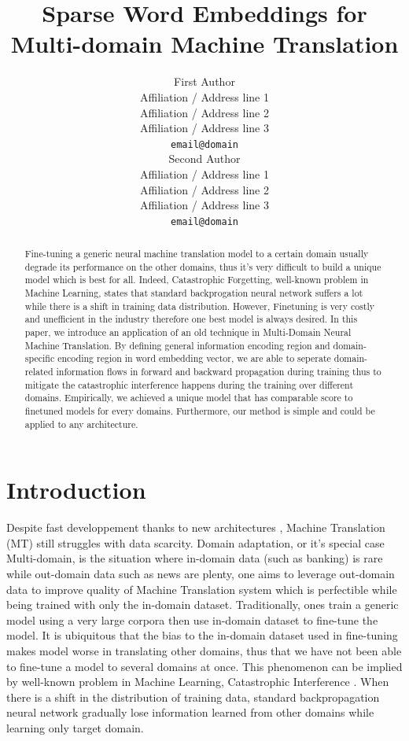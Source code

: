 \documentclass[11pt,a4paper]{article}
\title{Sparse Word Embeddings for Multi-domain Machine Translation}
\author{First Author \\%
  Affiliation / Address line 1 \\
  Affiliation / Address line 2 \\
  Affiliation / Address line 3 \\
  {\tt email@domain} \\\And
  Second Author \\
  Affiliation / Address line 1 \\
  Affiliation / Address line 2 \\
  Affiliation / Address line 3 \\
  {\tt email@domain} \\}
\date{}
\newcommand{\fyTodo}[1]{\Todo[FY:]{\textcolor{orange}{#1}}}
\newcommand{\fyDone}[1]{\done[FY]\Todo[FY:]{\textcolor{orange}{#1}}}
\begin{document}
\maketitle

\fyDone{s/naacl/EMNLP/g}
\fyTodo{Too long, selfcontained, noref, rewrite}
\begin{abstract}
Fine-tuning a generic neural machine translation model to a certain domain usually degrade its performance on the other domains, thus it's very difficult to build a unique model which is best for all. Indeed, Catastrophic Forgetting, well-known problem in Machine Learning, states that standard backprogation neural network suffers a lot while there is a shift in training data distribution. However, Finetuning is very costly and unefficient in the industry therefore one best model is always desired. In this paper, we introduce an application of an old technique \cite{Daume07frustratingly} in Multi-Domain Neural Machine Translation. By defining general information encoding region and domain-specific encoding region in word embedding vector, we are able to seperate domain-related information flows in forward and backward propagation during training thus to
mitigate the catastrophic interference happens during the training over different domains. Empirically, we achieved a unique model that has comparable score to finetuned models for every domains. Furthermore, our method is simple and could be applied to any architecture.
\end{abstract}

\section{Introduction \label{sec:introduction}}
\fyDone{Merge refs and order chronologically}
\fyTodo{Homogeneize cite keys, avoid arxiv}

Despite fast developpement thanks to new architectures \cite{Kalchbrenner13recurrent, Sutskever2014Sequence, bahdanau2014neural, Vaswani17attention}, Machine Translation (MT) still struggles with data scarcity. Domain adaptation, or it's special case Multi-domain, is the situation where in-domain data (such as banking) is rare while out-domain data such as news are plenty, one aims to leverage out-domain data to improve quality of Machine Translation system which is perfectible while being trained with only the in-domain dataset. Traditionally, ones train a generic model using a very large corpora then use in-domain dataset to fine-tune the model. It is ubiquitous that the bias to the in-domain dataset used in fine-tuning makes model worse in translating other domains, thus that we have not been able to fine-tune a model to several domains at once. This phenomenon can be implied by well-known problem in Machine Learning, Catastrophic Interference \cite{McCloskey1989Catastrophic}. When there is a shift in the distribution of training data, standard backpropagation neural network\fyTodo{Generic ? backprop or NN problem ?} gradually lose information learned from other domains while learning only target domain.
\end{document}
